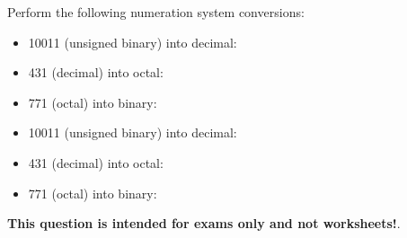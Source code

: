 

Perform the following numeration system conversions:

\begin{itemize}
\item{} 10011 (unsigned binary) into decimal: \underbar{\hskip 50pt}
\vskip 10pt
\item{} 431 (decimal) into octal: \underbar{\hskip 50pt}
\vskip 10pt
\item{} 771 (octal) into binary: \underbar{\hskip 50pt}
\end{itemize}







\begin{itemize}
\item{} 10011 (unsigned binary) into decimal: 
\vskip 10pt
\item{} 431 (decimal) into octal: 
\vskip 10pt
\item{} 771 (octal) into binary: 
\end{itemize}







{\bf This question is intended for exams only and not worksheets!}.




